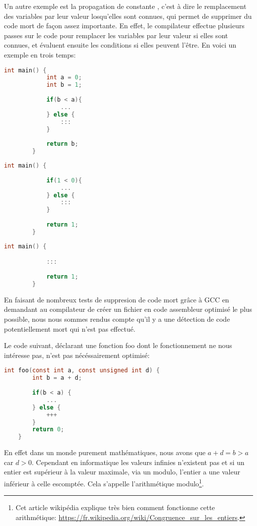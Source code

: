 Un autre exemple est la propagation de constante \cite{compilateurs}, c'est à dire le remplacement des variables par leur valeur losqu'elles sont connues, qui permet de supprimer du code mort de façon assez importante. En effet, le compilateur effectue plusieurs passes sur le code pour remplacer les variables par leur valeur si elles sont connues, et évaluent ensuite les conditions si elles peuvent l'être.
\newpage
En voici un exemple en trois temps:
\begin{multicols}{3}
    \begin{lstlisting}[language=c]
        int main() {
            int a = 0;
            int b = 1;
            
            if(b < a){
                ...
            } else {
                :::
            }
        
            return b;
        }
    \end{lstlisting}
    \columnbreak
    \begin{lstlisting}[language=c]
        int main() {
            
            if(1 < 0){
                ...
            } else {
                :::
            }
        
            return 1;
        }
    \end{lstlisting}
    \columnbreak
    \begin{lstlisting}[language=c]
        int main() {

            :::
        
            return 1;
        }
    \end{lstlisting}
\end{multicols}
\begin{center}
\end{center}
En faisant de nombreux tests de suppresion de code mort grâce à GCC en demandant au compilateur de créer un fichier en code assembleur optimisé le plus possible, nous nous sommes rendus compte qu'il y a une détection de code \og potentiellement mort \fg{} qui n'est pas effectué.

Le code suivant, déclarant une fonction foo dont le fonctionnement ne nous intéresse pas, n'est pas nécéssairement optimisé:
\begin{lstlisting}[language=c, xleftmargin=.2\textwidth, caption={Exemple de programme avec du code potentiellement mort}, captionpos=b]
    int foo(const int a, const unsigned int d) {
        int b = a + d;
        
        if(b < a) {
            ...
        } else {
            +++
        }
        return 0;
    }
\end{lstlisting}
En effet dans un monde purement mathématiques, nous avons que $a + d = b > a$ car $d > 0$. Cependant en informatique les valeurs infinies n'existent pas et si un entier est supérieur à la valeur maximale, via un modulo, l'entier a une valeur inférieur à celle escomptée. Cela s'appelle \og l'arithmétique modulo\footnote{Cet article wikipédia explique très bien comment fonctionne cette arithmétique: \url{https://fr.wikipedia.org/wiki/Congruence_sur_les_entiers}.}\fg{}.


